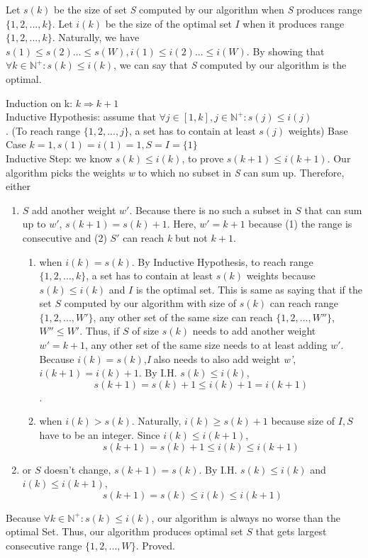 \documentclass{article}
\begin{document}
        Let $s(k)$ be the size of set \textit{S} computed by our algorithm when \textit{S} produces range $\{1,2,...,k\}$. Let $i(k)$ be the size of the optimal set $I$ when it produces range $\{1,2,...,k\}$. Naturally, we have $s(1)\leq s(2)...\leq s(W), i(1)\leq i(2)...\leq i(W). $ By showing that $\forall k\in \mathbb{N}^{+}: s(k) \leq i(k)$, we can say that \textit{S} computed by our algorithm is the optimal.
        
            Induction on k: $k\Rightarrow k+1$\\
             Inductive Hypothesis: assume that $\forall j\in [1,k], j\in \mathbb{N}^{+}: s(j)\leq i(j)$\\. (To reach range $\{1,2,...,j\}$, a set has to contain at least $s(j)$ weights)
            Base Case $k = 1, s(1)=i(1)=1, S=I=\{1\}$\\
            Inductive Step: we know $s(k)\leq i(k)$, to prove $s(k+1)\leq i(k+1)$. Our algorithm picks the weights \textit{w} to which no subset in \textit{S} can sum up. Therefore, either \begin{enumerate}
                \item $S$ add another weight $w'$. Because there is no such a subset in $S$ that can sum up to $w'$, $s(k+1) = s(k) + 1$. Here, $w' = k+1$ because (1) the range is consecutive and (2) $S'$ can reach \textit{k} but not $k+1$.
                \begin{enumerate}
                    \item when $i(k) = s(k)$.  By Inductive Hypothesis, to reach range $\{1,2,...,k\}$, a set has to contain at least $s(k)$ weights because $s(k)\leq i(k)$ and $I$ is the optimal set. This is same as saying that if the set $S$ computed by our algorithm with size of $s(k)$ can reach range $\{1,2,...,W'\}$, any other set of the same size can reach $\{1,2,...,W''\}$, $W''\leq W'$. 
                    Thus, if $S$ of size $s(k)$ needs to add another weight $w'=k+1$, any other set of the same size needs to at least adding $w'$. Because $i(k)=s(k)$,\textit{I} also needs to also add weight \textit{w'}, $i(k+1) = i(k)+1$. By I.H. $s(k)\leq i(k)$, 
                    \[s(k+1)=s(k)+1\leq i(k)+1=i(k+1)\].
                    
                    \item when $i(k) > s(k)$. Naturally, $i(k) \geq s(k) + 1$ because size of $I, S$ have to be an integer. Since $i(k) \leq i(k+1)$, \[s(k+1)=s(k)+1\leq i(k)\leq i(k+1)\]
                    
                \end{enumerate}
                \item or $S$ doesn't change, $s(k+1) = s(k)$. By I.H. $s(k)\leq i(k)$ and $i(k)\leq i(k+1)$, \[s(k+1) = s(k) \leq i(k) \leq i(k+1)\]
            \end{enumerate}
            Because $\forall k\in \mathbb{N}^{+}: s(k)\leq i(k) $, our algorithm is always no worse than the optimal Set. Thus, our algorithm produces optimal set $S$ that gets largest consecutive range $\{1,2,...,W\}$. Proved.
\end{document}
